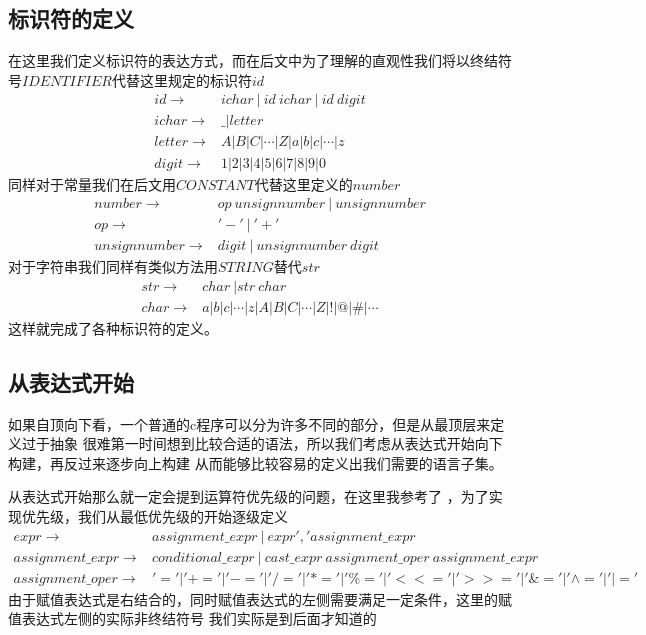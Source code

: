 \documentclass[UTF8]{ctexart}
\begin{document}
\subsection{标识符的定义}
在这里我们定义标识符的表达方式，而在后文中为了理解的直观性我们将以终结符号$IDENTIFIER$代替这里规定的标识符$id$
\begin{align*}
	id\to & ichar\ |\ id\ ichar\ |\ id\ digit\\
	ichar\to & \_|letter\\
	letter\to & A|B|C|\cdots|Z|a|b|c|\cdots|z\\
	digit\to & 1|2|3|4|5|6|7|8|9|0
\end{align*}
同样对于常量我们在后文用$CONSTANT$代替这里定义的$number$
\begin{align*}
	number\to & op\ unsignnumber\ |\ unsignnumber\\
	op\to & '-'\ |\ '+'\\
	unsignnumber\to & digit\ |\ unsignnumber\ digit
\end{align*}
对于字符串我们同样有类似方法用$STRING$替代$str$
\begin{align*}
	str\to & char\ |str\ char\\
	char\to & a|b|c|\cdots|z|A|B|C|\cdots|Z|!|@|\#|\cdots
\end{align*}
这样就完成了各种标识符的定义。
\subsection{从表达式开始}
如果自顶向下看，一个普通的c程序可以分为许多不同的部分，但是从最顶层来定义过于抽象
很难第一时间想到比较合适的语法，所以我们考虑从表达式开始向下构建，再反过来逐步向上构建
从而能够比较容易的定义出我们需要的语言子集。

从表达式开始那么就一定会提到运算符优先级的问题，在这里我参考了\cite{C operator list}
，为了实现优先级，我们从最低优先级的开始逐级定义
\begin{align*}
    expr\to &assignment\_expr\ |\ expr','assignment\_expr\\
    assignment\_expr\to &conditional\_expr\ |\ cast\_expr\ assignment\_oper\ assignment\_expr\\
    assignment\_oper\to &'='|'+='|'-='|'/='|'*='|'\%='|'<<='|'>>='|'\&='|'\wedge='|'|=' 
\end{align*}
由于赋值表达式是右结合的，同时赋值表达式的左侧需要满足一定条件，这里的赋值表达式左侧的实际非终结符号
我们实际是到后面才知道的
\end{document}
